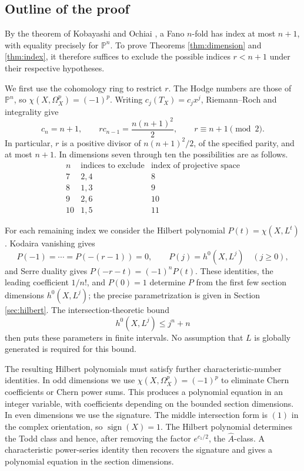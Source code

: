 \documentclass[11pt,reqno,letterpaper]{amsart}
\newcommand{\PP}{\mathbb P}
\newcommand{\sgn}{\operatorname{sign}}
\theoremstyle{definition}
\numberwithin{equation}{section}
\begin{document}
\subsection{Outline of the proof}

By the theorem of Kobayashi and Ochiai \cite{ko}, a Fano $n$-fold has
index at most $n+1$, with equality precisely for $\PP^n$. To prove
Theorems \ref{thm:dimension} and \ref{thm:index}, it therefore suffices
to exclude the possible indices $r<n+1$ under their respective
hypotheses.

We first use the cohomology ring to restrict $r$. The Hodge numbers are
those of $\PP^n$, so $\chi(X,\Omega_X^p)=(-1)^p$. Writing
$c_j(T_X)=c_jx^j$, Riemann--Roch and integrality give
\begin{equation}\label{eq:introindices}
 c_n=n+1,\qquad
 r c_{n-1}=\frac{n(n+1)^2}{2},\qquad
 r\equiv n+1\pmod2.
\end{equation}
In particular, $r$ is a positive divisor of $n(n+1)^2/2$, of the
specified parity, and at most $n+1$. In dimensions seven through ten
the possibilities are as follows.
\[
\begin{array}{c|c|c}
n&\text{indices to exclude}&\text{index of projective space}\\\hline
7&2,4&8\\
8&1,3&9\\
9&2,6&10\\
10&1,5&11
\end{array}
\]

For each remaining index we consider the Hilbert polynomial
$P(t)=\chi(X,L^t)$. Kodaira vanishing gives
\[
 P(-1)=\cdots=P(-(r-1))=0,
 \qquad P(j)=h^0(X,L^j)\quad(j\ge0),
\]
and Serre duality gives $P(-r-t)=(-1)^nP(t)$. These identities, the
leading coefficient $1/n!$, and $P(0)=1$ determine $P$ from the first
few section dimensions $h^0(X,L^j)$; the precise parametrization is
given in Section \ref{sec:hilbert}. The intersection-theoretic bound
\[
 h^0(X,L^j)\le j^n+n
\]
then puts these parameters in finite intervals. No assumption that $L$
is globally generated is required for this bound.

The resulting Hilbert polynomials must satisfy further
characteristic-number identities. In odd dimensions we use
$\chi(X,\Omega_X^p)=(-1)^p$ to eliminate Chern coefficients or Chern
power sums. This produces a polynomial equation in an integer variable,
with coefficients depending on the bounded section dimensions. In even
dimensions we use the signature. The middle intersection form is $(1)$
in the complex orientation, so $\sgn(X)=1$. The Hilbert polynomial
determines the Todd class and hence, after removing the factor
$e^{c_1/2}$, the $\widehat A$-class. A characteristic power-series
identity then recovers the signature and gives a polynomial equation in
the section dimensions.
\end{document}
